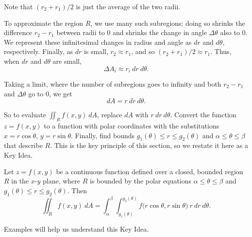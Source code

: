 Note that $(r_2+r_1)/2$ is just the average of the two radii. 

To approximate the region $R$, we use many such subregions; doing so shrinks the difference $r_2-r_1$ between radii to 0 and shrinks the change in angle $\Delta \theta$ also to 0. We represent these infinitesimal changes in radius and angle as $dr$ and $d\theta$, respectively. Finally, as $dr$ is small, $r_2\approx r_1$, and so $(r_2+r_1)/2\approx r_1$. Thus, when $dr$ and $d\theta$ are small, 
$$\Delta A_i \approx r_i\ dr\ d\theta.$$

Taking a limit, where the number of subregions goes to infinity and both $r_2-r_1$ and $\Delta\theta$ go to 0, we get $$dA = r\ dr\ d\theta.$$

So to evaluate $\iint_Rf(x,y)\ dA$, replace $dA$ with $r\ dr\ d\theta$. Convert the function $z=f(x,y)$ to a function with polar coordinates with the substitutions $x=r\cos\theta$, $y=r\sin\theta$. Finally, find bounds $g_1(\theta)\leq r\leq g_2(\theta)$ and $\alpha\leq\theta\leq\beta$ that describe $R$. This is the key principle of this section, so we restate it here as a Key Idea.

{Let $z=f(x,y)$ be a continuous function defined over a closed, bounded region $R$ in the $x$-$y$ plane, where $R$ is
bounded by the polar equations $\alpha\leq\theta\leq\beta$ and  $g_1(\theta)\leq r\leq g_2(\theta)$. Then
$$\iint_Rf(x,y)\ dA = \int_\alpha^\beta\int_{g_1(\theta)}^{g_2(\theta)} f\big(r\cos\theta,r\sin\theta\big)\ r\ dr\ d\theta.$$
}

\enlargethispage{3\baselineskip}
Examples will help us understand this Key Idea.\\

